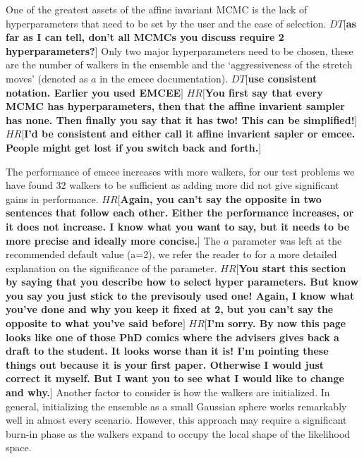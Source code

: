 \documentclass{aa}
\def\memohr#1{\color{blue}$HR[${\bf #1}$]$ \color{black}}
\def\memodt#1{\color{green}$DT[${\bf #1}$]$ \color{black}}
\begin{document}
One of the greatest assets of the affine invariant MCMC is the lack of hyperparameters that need to be set by the user and the ease of selection. \memodt{as far as I can tell, don't all MCMCs you discuss require 2 hyperparameters?}
Only two major hyperparameters need to be chosen, these are the number of walkers in the ensemble and the `aggressiveness of the stretch moves' (denoted as $a$ in the emcee documentation). \memodt{use consistent notation. Earlier you used EMCEE}
\memohr{You first say that every MCMC has hyperparameters, then that the affine invarient sampler has none. Then finally you say that it has two! This can be simplified!}
\memohr{I'd be consistent and either call it affine invarient sapler or emcee. People might get lost if you switch back and forth.}

The performance of emcee increases with more walkers, for our test problems we have found 32 walkers to be sufficient as adding more did not give significant gains in performance. 
\memohr{Again, you can't say the opposite in two sentences that follow each other. Either the performance increases, or it does not increase. I know what you want to say, but it needs to be more precise and ideally more concise.}
The $a$ parameter was left at the recommended default value (a=2), we refer the reader to \cite{Foreman-Mackey2013} for a more detailed explanation on the significance of the parameter. 
\memohr{You start this section by saying that you describe how to select hyper parameters. But know you say you just stick to the previsouly used one! Again, I know what you've done and why you keep it fixed at 2, but you can't say the opposite to what you've said before}
\memohr{I'm sorry. By now this page looks like one of those PhD comics where the advisers gives back a draft to the student. It looks worse than it is! I'm pointing these things out because it is your first paper. Otherwise I would just correct it myself. But I want you to see what I would like to change and why.}
Another factor to consider is how the walkers are initialized. In general, initializing the ensemble as a small Gaussian sphere works remarkably well in almost every scenario. 
However, this approach may require a significant burn-in phase as the walkers expand to occupy the local shape of the likelihood space.
\end{document}
